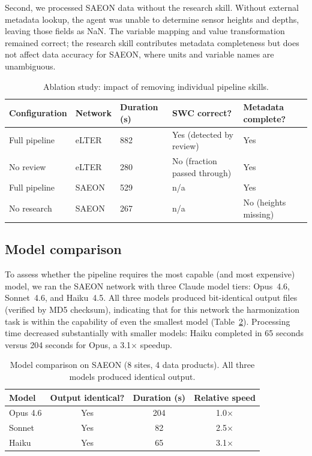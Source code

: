 \documentclass[review,authoryear]{elsarticle}
\begin{document}
Second, we processed SAEON data without the research skill. Without external metadata lookup, the agent was unable to determine sensor heights and depths, leaving those fields as NaN. The variable mapping and value transformation remained correct; the research skill contributes metadata completeness but does not affect data accuracy for SAEON, where units and variable names are unambiguous.

\begin{table}[htbp]
\centering
\caption{Ablation study: impact of removing individual pipeline skills.}
\label{tab:ablation}
\small
\begin{tabular}{lllll}
\toprule
Configuration & Network & Duration (s) & SWC correct? & Metadata complete? \\
\midrule
Full pipeline & eLTER & 882 & Yes (detected by review) & Yes \\
No review & eLTER & 280 & No (fraction passed through) & Yes \\
Full pipeline & SAEON & 529 & n/a & Yes \\
No research & SAEON & 267 & n/a & No (heights missing) \\
\bottomrule
\end{tabular}
\end{table}

\subsection{Model comparison}
\label{sec:model-comparison}

To assess whether the pipeline requires the most capable (and most expensive) model, we ran the SAEON network with three Claude model tiers: Opus~4.6, Sonnet~4.6, and Haiku~4.5. All three models produced bit-identical output files (verified by MD5 checksum), indicating that for this network the harmonization task is within the capability of even the smallest model (Table~\ref{tab:models}). Processing time decreased substantially with smaller models: Haiku completed in 65 seconds versus 204 seconds for Opus, a 3.1$\times$ speedup.

\begin{table}[htbp]
\centering
\caption{Model comparison on SAEON (8 sites, 4 data products). All three models produced identical output.}
\label{tab:models}
\small
\begin{tabular}{lccc}
\toprule
Model & Output identical? & Duration (s) & Relative speed \\
\midrule
Opus 4.6 & Yes & 204 & 1.0$\times$ \\
Sonnet & Yes & 82 & 2.5$\times$ \\
Haiku & Yes & 65 & 3.1$\times$ \\
\bottomrule
\end{tabular}
\end{table}
\end{document}
